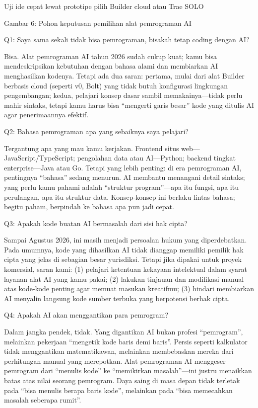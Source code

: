 Uji ide cepat lewat prototipe pilih Builder cloud atau Trae SOLO

\begin{center}\small\color{gray}Gambar 6: Pohon keputusan pemilihan alat pemrograman AI\end{center}


Q1: Saya sama sekali tidak bisa pemrograman, bisakah tetap coding dengan AI?

Bisa. Alat pemrograman AI tahun 2026 sudah cukup kuat; kamu bisa mendeskripsikan kebutuhan dengan bahasa alami dan membiarkan AI menghasilkan kodenya. Tetapi ada dua saran: pertama, mulai dari alat Builder berbasis cloud (seperti v0, Bolt) yang tidak butuh konfigurasi lingkungan pengembangan; kedua, pelajari konsep dasar sambil memakainya—tidak perlu mahir sintaks, tetapi kamu harus bisa “mengerti garis besar” kode yang ditulis AI agar penerimaannya efektif.

Q2: Bahasa pemrograman apa yang sebaiknya saya pelajari?

Tergantung apa yang mau kamu kerjakan. Frontend situs web—JavaScript/TypeScript; pengolahan data atau AI—Python; backend tingkat enterprise—Java atau Go. Tetapi yang lebih penting: di era pemrograman AI, pentingnya “bahasa” sedang menurun. AI membantu menangani detail sintaks; yang perlu kamu pahami adalah “struktur program”—apa itu fungsi, apa itu perulangan, apa itu struktur data. Konsep-konsep ini berlaku lintas bahasa; begitu paham, berpindah ke bahasa apa pun jadi cepat.

Q3: Apakah kode buatan AI bermasalah dari sisi hak cipta?

Sampai Agustus 2026, ini masih menjadi persoalan hukum yang diperdebatkan. Pada umumnya, kode yang dihasilkan AI tidak dianggap memiliki pemilik hak cipta yang jelas di sebagian besar yurisdiksi. Tetapi jika dipakai untuk proyek komersial, saran kami: (1) pelajari ketentuan kekayaan intelektual dalam syarat layanan alat AI yang kamu pakai; (2) lakukan tinjauan dan modifikasi manual atas kode-kode penting agar memuat masukan kreatifmu; (3) hindari membiarkan AI menyalin langsung kode sumber terbuka yang berpotensi berhak cipta.

Q4: Apakah AI akan menggantikan para pemrogram?

Dalam jangka pendek, tidak. Yang digantikan AI bukan profesi “pemrogram”, melainkan pekerjaan “mengetik kode baris demi baris”. Persis seperti kalkulator tidak menggantikan matematikawan, melainkan membebaskan mereka dari perhitungan manual yang merepotkan. Alat pemrograman AI menggeser pemrogram dari “menulis kode” ke “memikirkan masalah”—ini justru menaikkan batas atas nilai seorang pemrogram. Daya saing di masa depan tidak terletak pada “bisa menulis berapa baris kode”, melainkan pada “bisa memecahkan masalah seberapa rumit”.

